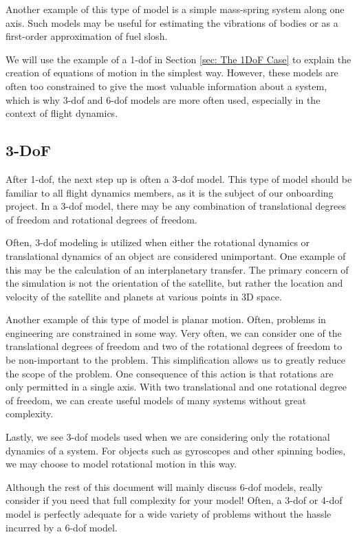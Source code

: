 \documentclass[12pt]{report}
\begin{document}
Another example of this type of model is a simple mass-spring system along one axis. Such models may be useful for estimating the vibrations of bodies or as a first-order approximation of fuel slosh.

We will use the example of a 1-\gls{dof} in Section \ref{sec: The 1DoF Case} to explain the creation of equations of motion in the simplest way. However, these models are often too constrained to give the most valuable information about a system, which is why 3-\gls{dof} and 6-\gls{dof} models are more often used, especially in the context of flight dynamics.
\subsection{3-DoF}
After 1-\gls{dof}, the next step up is often a 3-\gls{dof} model. This type of model should be familiar to all flight dynamics members, as it is the subject of our onboarding project. In a 3-\gls{dof} model, there may be any combination of translational degrees of freedom and rotational degrees of freedom.

Often, 3-\gls{dof} modeling is utilized when either the rotational dynamics or translational dynamics of an object are considered unimportant. One example of this may be the calculation of an interplanetary transfer. The primary concern of the simulation is not the orientation of the satellite, but rather the location and velocity of the satellite and planets at various points in 3D space. 

Another example of this type of model is planar motion. Often, problems in engineering are constrained in some way. Very often, we can consider one of the translational degrees of freedom and two of the rotational degrees of freedom to be non-important to the problem. This simplification allows us to greatly reduce the scope of the problem. One consequence of this action is that rotations are only permitted in a single axis. With two translational and one rotational degree of freedom, we can create useful models of many systems without great complexity.

Lastly, we see 3-\gls{dof} models used when we are considering only the rotational dynamics of a system. For objects such as gyroscopes and other spinning bodies, we may choose to model rotational motion in this way.

Although the rest of this document will mainly discuss 6-\gls{dof} models, really consider if you need that full complexity for your model! Often, a 3-\gls{dof} or 4-\gls{dof} model is perfectly adequate for a wide variety of problems without the hassle incurred by a 6-\gls{dof} model. 
\end{document}

